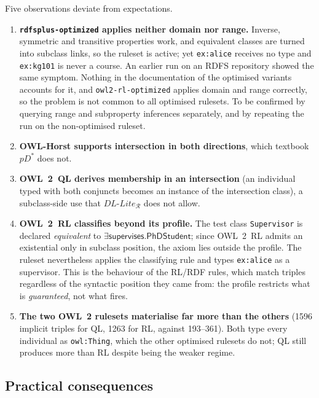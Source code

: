 \documentclass[11pt,a4paper]{article}
\newcommand{\dllite}[1]{\ensuremath{\textit{DL-Lite}_{#1}}}
\newcommand{\cn}[1]{\mathsf{#1}}      %
\newcommand{\rn}[1]{\mathsf{#1}}      %
\begin{document}
Five observations deviate from expectations.
\begin{enumerate}
  \item \textbf{\texttt{rdfsplus-optimized} applies neither domain nor
    range.} Inverse, symmetric and transitive properties work, and
    equivalent classes are turned into subclass links, so the ruleset is
    active; yet \texttt{ex:alice} receives no type and \texttt{ex:kg101} is
    never a course. An earlier run on an RDFS repository showed the same
    symptom. Nothing in the documentation of the optimised variants accounts
    for it, and \texttt{owl2-rl-optimized} applies domain and range
    correctly, so the problem is not common to all optimised rulesets. To be
    confirmed by querying range and subproperty inferences separately, and by
    repeating the run on the non-optimised ruleset.
  \item \textbf{OWL-Horst supports intersection in both directions}, which
    textbook $pD^*$ does not.
  \item \textbf{OWL~2~QL derives membership in an intersection} (an individual
    typed with both conjuncts becomes an instance of the intersection class),
    a subclass-side use that $\dllite{\mathcal{R}}$ does not allow.
  \item \textbf{OWL~2~RL classifies beyond its profile.} The test class
    \texttt{Supervisor} is declared \emph{equivalent} to
    $\exists\rn{supervises}.\cn{PhDStudent}$; since OWL~2~RL admits an
    existential only in subclass position, the axiom lies outside the
    profile. The ruleset nevertheless applies the classifying rule and types
    \texttt{ex:alice} as a supervisor. This is the behaviour of the RL/RDF
    rules, which match triples regardless of the syntactic position they came
    from: the profile restricts what is \emph{guaranteed}, not what fires.
  \item \textbf{The two OWL~2 rulesets materialise far more than the others}
    (1596 implicit triples for QL, 1263 for RL, against 193--361). Both type
    every individual as \texttt{owl:Thing}, which the other optimised
    rulesets do not; QL still produces more than RL despite being the weaker
    regime.
\end{enumerate}

\subsection*{Practical consequences}
\end{document}
